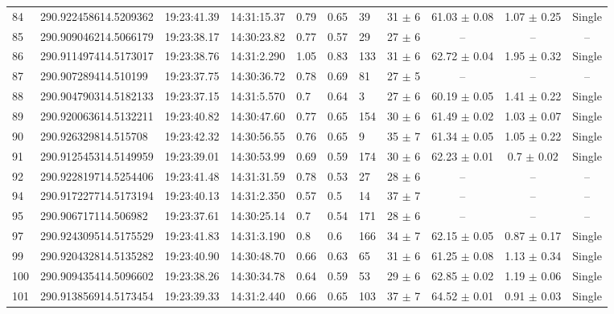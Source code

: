 \documentclass[longauth]{aa} %
\begin{document}
\begin{appendix}
\begin{table}[htbp!]
\begin{tabular}{llllllllccc}
84  &  290.922458614.5209362  &  19:23:41.39  &  14:31:15.37  &  0.79  &  0.65  &  39  &  31 $\pm$ 6  &  61.03 $\pm$ 0.08  &  1.07 $\pm$ 0.25  &  Single \\
85  &  290.909046214.5066179  &  19:23:38.17  &  14:30:23.82  &  0.77  &  0.57  &  29  &  27 $\pm$ 6  &  --  &  --  &  -- \\
86  &  290.911497414.5173017  &  19:23:38.76  &  14:31:2.290  &  1.05  &  0.83  &  133  &  31 $\pm$ 6  &  62.72 $\pm$ 0.04  &  1.95 $\pm$ 0.32  &  Single \\
87  &  290.907289414.510199  &  19:23:37.75  &  14:30:36.72  &  0.78  &  0.69  &  81  &  27 $\pm$ 5  &  --  &  --  &  -- \\
88  &  290.904790314.5182133  &  19:23:37.15  &  14:31:5.570  &  0.7  &  0.64  &  3  &  27 $\pm$ 6  &  60.19 $\pm$ 0.05  &  1.41 $\pm$ 0.22  &  Single \\
89  &  290.920063614.5132211  &  19:23:40.82  &  14:30:47.60  &  0.77  &  0.65  &  154  &  30 $\pm$ 6  &  61.49 $\pm$ 0.02  &  1.03 $\pm$ 0.07  &  Single \\
90  &  290.926329814.515708  &  19:23:42.32  &  14:30:56.55  &  0.76  &  0.65  &  9  &  35 $\pm$ 7  &  61.34 $\pm$ 0.05  &  1.05 $\pm$ 0.22  &  Single \\
91  &  290.912545314.5149959  &  19:23:39.01  &  14:30:53.99  &  0.69  &  0.59  &  174  &  30 $\pm$ 6  &  62.23 $\pm$ 0.01  &  0.7 $\pm$ 0.02  &  Single \\
92  &  290.922819714.5254406  &  19:23:41.48  &  14:31:31.59  &  0.78  &  0.53  &  27  &  28 $\pm$ 6  &  --  &  --  &  -- \\
94  &  290.917227714.5173194  &  19:23:40.13  &  14:31:2.350  &  0.57  &  0.5  &  14  &  37 $\pm$ 7  &  --  &  --  &  -- \\
95  &  290.906717114.506982  &  19:23:37.61  &  14:30:25.14  &  0.7  &  0.54  &  171  &  28 $\pm$ 6  &  --  &  --  &  -- \\
97  &  290.924309514.5175529  &  19:23:41.83  &  14:31:3.190  &  0.8  &  0.6  &  166  &  34 $\pm$ 7  &  62.15 $\pm$ 0.05  &  0.87 $\pm$ 0.17  &  Single \\
99  &  290.920432814.5135282  &  19:23:40.90  &  14:30:48.70  &  0.66  &  0.63  &  65  &  31 $\pm$ 6  &  61.25 $\pm$ 0.08  &  1.13 $\pm$ 0.34  &  Single \\
100  &  290.909435414.5096602  &  19:23:38.26  &  14:30:34.78  &  0.64  &  0.59  &  53  &  29 $\pm$ 6  &  62.85 $\pm$ 0.02  &  1.19 $\pm$ 0.06  &  Single \\
101  &  290.913856914.5173454  &  19:23:39.33  &  14:31:2.440  &  0.66  &  0.65  &  103  &  37 $\pm$ 7  &  64.52 $\pm$ 0.01  &  0.91 $\pm$ 0.03  &  Single \\

\end{tabular}
\end{table}
\end{appendix}
\end{document}
